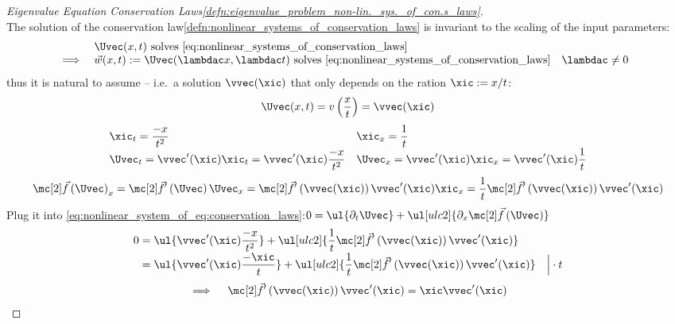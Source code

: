 \begin{proofbox}\nospacing
    \begin{proof}[Eigenvalue Equation Conservation Laws\cref{defn:eigenvalue_problem_non-lin._sys._of_con.s_laws}]
        \label{proof:eigenvalue_problem_conservation_laws}\leavevmode\\
        The solution of the conservation law\cref{defn:nonlinear_systems_of_conservation_laws} is invariant to the scaling of the input parameters:
        \begin{align*}
          &&&\Uvec(x,t)\text{ solves \cref{eq:nonlinear_systems_of_conservation_laws}}\\[-1\jot]
          &\implies&&\vec{w}(x,t):=\Uvec(\lambdac x,\lambdac t)\text{ solves \cref{eq:nonlinear_systems_of_conservation_laws}}&&\lambdac\neq0
        \end{align*}
        thus it is natural to assume  -- i.e.\ a solution $\vvec(\xic)$ that only depends on the ration $\xic:=x/t$:
        \begin{align*}
          \Uvec(x,t)=v \left(\frac{x}{t}\right)=\vvec(\xic)
        \end{align*}
        \begin{align*}
          &\xic_{t}=\frac{-x}{t^{2}}&&\xic_{x}=\frac{1}{t} \\[-1\jot]
          &\Uvec_{t}=\vvec'(\xic)\xic_{t}=\vvec'(\xic)\frac{-x}{t^{2}}&&\Uvec_{x}=\vvec'(\xic)\xic_{x}=\vvec'(\xic)\frac{1}{t}
        \end{align*}
        \begin{align*}
          \fluxvec\left(\Uvec\right)_{x}=\fluxvec'\left(\Uvec\right)\Uvec_{x}=\fluxvec' \left(\vvec(\xic)\right)\vvec'(\xic)\xic_{x}
          =\frac{1}{t}\fluxvec' \left(\vvec(\xic)\right)\vvec'(\xic)
        \end{align*}
        Plug it into \cref{eq:nonlinear_system_of_eq:conservation_laws}:\hfil $0=\ul{\partial_{t}\Uvec}+\ul[ulc2]{\partial_{x}\fluxvec\left(\Uvec\right)}$
        \begin{align*}
          0&=\ul{\vvec'(\xic)\frac{-x}{t^{2}}}+\ul[ulc2]{\frac{1}{t}\fluxvec'\left(\vvec(\xic)\right)\vvec'(\xic)} \\[-1\jot]
          &=\ul{\vvec'(\xic)\frac{-\xic}{t}}+\ul[ulc2]{\frac{1}{t}\fluxvec'\left(\vvec(\xic)\right)\vvec'(\xic)}&\Big|\cdot t
        \end{align*}
        \begin{align*}
          \implies\quad\fluxvec'\left(\vvec(\xic)\right)\vvec'(\xic)=\xic\vvec'(\xic)

\end{align*}
\end{proof}
\end{proofbox}
